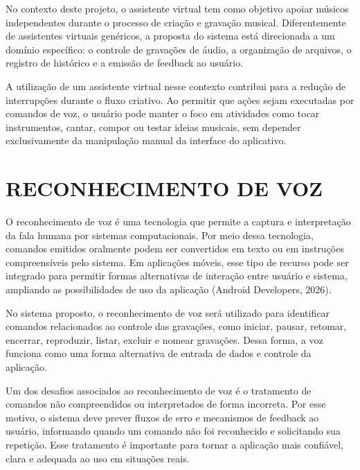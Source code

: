 \documentclass[12pt,oneside,a4paper,brazil,final]{abntex2}
\begin{document}
No contexto deste projeto, o assistente virtual tem como objetivo apoiar músicos independentes durante o processo de criação e gravação musical. Diferentemente de assistentes virtuais genéricos, a proposta do sistema está direcionada a um domínio específico: o controle de gravações de áudio, a organização de arquivos, o registro de histórico e a emissão de feedback ao usuário.



A utilização de um assistente virtual nesse contexto contribui para a redução de interrupções durante o fluxo criativo. Ao permitir que ações sejam executadas por comandos de voz, o usuário pode manter o foco em atividades como tocar instrumentos, cantar, compor ou testar ideias musicais, sem depender exclusivamente da manipulação manual da interface do aplicativo.



\section{RECONHECIMENTO DE VOZ}



O reconhecimento de voz é uma tecnologia que permite a captura e interpretação da fala humana por sistemas computacionais. Por meio dessa tecnologia, comandos emitidos oralmente podem ser convertidos em texto ou em instruções compreensíveis pelo sistema. Em aplicações móveis, esse tipo de recurso pode ser integrado para permitir formas alternativas de interação entre usuário e sistema, ampliando as possibilidades de uso da aplicação (Android Developers, 2026).



No sistema proposto, o reconhecimento de voz será utilizado para identificar comandos relacionados ao controle das gravações, como iniciar, pausar, retomar, encerrar, reproduzir, listar, excluir e nomear gravações. Dessa forma, a voz funciona como uma forma alternativa de entrada de dados e controle da aplicação.



Um dos desafios associados ao reconhecimento de voz é o tratamento de comandos não compreendidos ou interpretados de forma incorreta. Por esse motivo, o sistema deve prever fluxos de erro e mecanismos de feedback ao usuário, informando quando um comando não foi reconhecido e solicitando sua repetição. Esse tratamento é importante para tornar a aplicação mais confiável, clara e adequada ao uso em situações reais.
\end{document}
